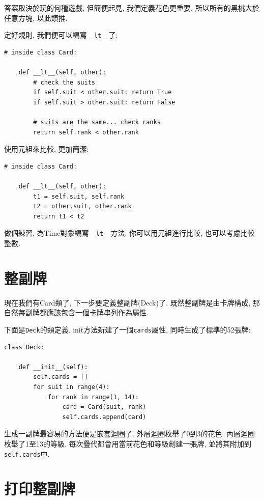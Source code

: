 \documentclass[10pt]{book}
\begin{document}
答案取決於玩的何種遊戲,
但簡便起見, 我們定義花色更重要, 所以所有的黑桃大於任意方塊, 以此類推. 

定好規則, 我們便可以編寫\verb"__lt__"了:

\begin{verbatim}
# inside class Card:

    def __lt__(self, other):
        # check the suits
        if self.suit < other.suit: return True
        if self.suit > other.suit: return False

        # suits are the same... check ranks
        return self.rank < other.rank
\end{verbatim}
%
使用元組來比較, 更加簡潔:

\begin{verbatim}
# inside class Card:

    def __lt__(self, other):
        t1 = self.suit, self.rank
        t2 = other.suit, other.rank
        return t1 < t2
\end{verbatim}
%
做個練習, 為Time對象編寫\verb"__lt__"方法. 
你可以用元組進行比較, 也可以考慮比較整數. 


\section{整副牌}

現在我們有Card類了, 下一步要定義整副牌(Deck)了. 
既然整副牌是由卡牌構成, 那自然每副牌都應該包含一個卡牌串列作為屬性. 

下面是{\tt Deck}的類定義. 
init方法新建了一個{\tt cards}屬性, 
同時生成了標準的52張牌:

\begin{verbatim}
class Deck:

    def __init__(self):
        self.cards = []
        for suit in range(4):
            for rank in range(1, 14):
                card = Card(suit, rank)
                self.cards.append(card)
\end{verbatim}
%
生成一副牌最容易的方法便是嵌套迴圈了. 
外層迴圈枚舉了0到3的花色. 
內層迴圈枚舉了1至13的等級. 
每次疊代都會用當前花色和等級創建一張牌, 
並將其附加到{\tt self.cards}中. 


\section{打印整副牌}
\label{printdeck}
\end{document}
